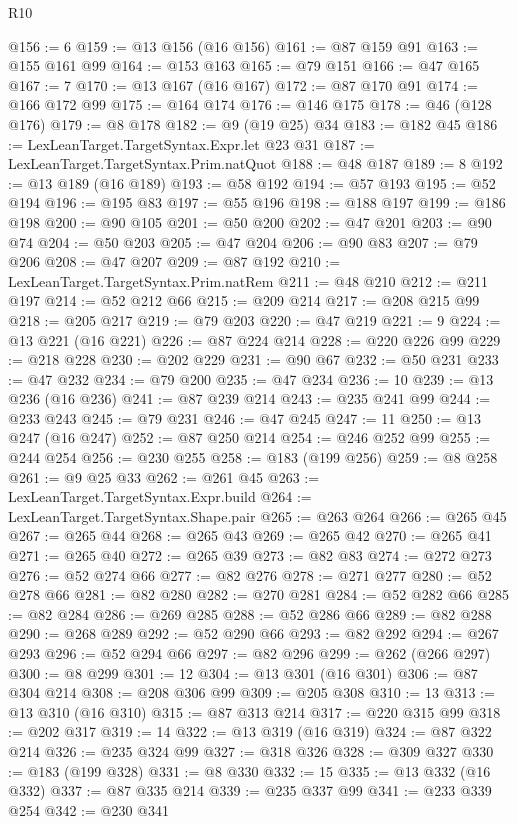 \begin{lexlean}{R10}
\begin{coremodule}
@156 := 6
@159 := @13 @156 (@16 @156)
@161 := @87 @159 @91
@163 := @155 @161 @99
@164 := @153 @163
@165 := @79 @151
@166 := @47 @165
@167 := 7
@170 := @13 @167 (@16 @167)
@172 := @87 @170 @91
@174 := @166 @172 @99
@175 := @164 @174
@176 := @146 @175
@178 := @46 (@128 @176)
@179 := @8 @178
@182 := @9 (@19 @25) @34
@183 := @182 @45
@186 := LexLeanTarget.TargetSyntax.Expr.let @23 @31
@187 := LexLeanTarget.TargetSyntax.Prim.natQuot
@188 := @48 @187
@189 := 8
@192 := @13 @189 (@16 @189)
@193 := @58 @192
@194 := @57 @193
@195 := @52 @194
@196 := @195 @83
@197 := @55 @196
@198 := @188 @197
@199 := @186 @198
@200 := @90 @105
@201 := @50 @200
@202 := @47 @201
@203 := @90 @74
@204 := @50 @203
@205 := @47 @204
@206 := @90 @83
@207 := @79 @206
@208 := @47 @207
@209 := @87 @192
@210 := LexLeanTarget.TargetSyntax.Prim.natRem
@211 := @48 @210
@212 := @211 @197
@214 := @52 @212 @66
@215 := @209 @214
@217 := @208 @215 @99
@218 := @205 @217
@219 := @79 @203
@220 := @47 @219
@221 := 9
@224 := @13 @221 (@16 @221)
@226 := @87 @224 @214
@228 := @220 @226 @99
@229 := @218 @228
@230 := @202 @229
@231 := @90 @67
@232 := @50 @231
@233 := @47 @232
@234 := @79 @200
@235 := @47 @234
@236 := 10
@239 := @13 @236 (@16 @236)
@241 := @87 @239 @214
@243 := @235 @241 @99
@244 := @233 @243
@245 := @79 @231
@246 := @47 @245
@247 := 11
@250 := @13 @247 (@16 @247)
@252 := @87 @250 @214
@254 := @246 @252 @99
@255 := @244 @254
@256 := @230 @255
@258 := @183 (@199 @256)
@259 := @8 @258
@261 := @9 @25 @33
@262 := @261 @45
@263 := LexLeanTarget.TargetSyntax.Expr.build
@264 := LexLeanTarget.TargetSyntax.Shape.pair
@265 := @263 @264
@266 := @265 @45
@267 := @265 @44
@268 := @265 @43
@269 := @265 @42
@270 := @265 @41
@271 := @265 @40
@272 := @265 @39
@273 := @82 @83
@274 := @272 @273
@276 := @52 @274 @66
@277 := @82 @276
@278 := @271 @277
@280 := @52 @278 @66
@281 := @82 @280
@282 := @270 @281
@284 := @52 @282 @66
@285 := @82 @284
@286 := @269 @285
@288 := @52 @286 @66
@289 := @82 @288
@290 := @268 @289
@292 := @52 @290 @66
@293 := @82 @292
@294 := @267 @293
@296 := @52 @294 @66
@297 := @82 @296
@299 := @262 (@266 @297)
@300 := @8 @299
@301 := 12
@304 := @13 @301 (@16 @301)
@306 := @87 @304 @214
@308 := @208 @306 @99
@309 := @205 @308
@310 := 13
@313 := @13 @310 (@16 @310)
@315 := @87 @313 @214
@317 := @220 @315 @99
@318 := @202 @317
@319 := 14
@322 := @13 @319 (@16 @319)
@324 := @87 @322 @214
@326 := @235 @324 @99
@327 := @318 @326
@328 := @309 @327
@330 := @183 (@199 @328)
@331 := @8 @330
@332 := 15
@335 := @13 @332 (@16 @332)
@337 := @87 @335 @214
@339 := @235 @337 @99
@341 := @233 @339 @254
@342 := @230 @341

\end{coremodule}
\end{lexlean}
